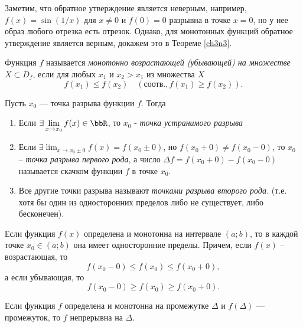 Заметим, что обратное утверждение является неверным, например, $f(x)= \sin(1/x)$ для $x\ne0$ и $f(0) = 0$ разрывна в точке $x = 0$, но у нее образ любого отрезка есть отрезок. Однако, для монотонных функций обратное утверждение является верным, докажем это в Теореме \ref{ch3n3}.
\begin{defn}
Функция $f$ называется \textit{монотонно возрастающей (убывающей) на множестве} $X \subset D_f$, если для любых $x_1$ и $x_2>x_1$ из множества $X$ 
$$
f(x_1)\le f(x_2) \quad (\text{соотв.}, f(x_1)\ge f(x_2)).
$$  
\end{defn}

\begin{defn}
Пусть $x_0$ --- точка разрыва функции $f$. Тогда 
\begin{enumerate}
\item

Если $\exists \lim_{x \to x_0}\limits f(x) \in \bbR$, то $x_0$ - \textit{точка устранимого разрыва}
\item
Если $\exists \lim_{x \to x_0\pm0}\limits f(x)=f(x_0\pm 0)$, но $f(x_0+0)\ne f(x_0-0)$, то $x_0$ -- \textit{точка разрыва первого рода}, а число $\Delta f=f(x_0+0)-f(x_0-0)$ называется скачком функции $f$ в точке $x_0$.
\item
Все другие точки разрыва называют \textit{точками разрыва второго рода.} (т.е. хотя бы один из односторонних пределов либо не существует, либо бесконечен).
\end{enumerate}
\end{defn}
\begin{thm} \label{ch3n1} 
Если функция $f(x)$ определена и монотонна на интервале $(a;b)$, то в каждой точке $x_0\in(a;b)$ она имеет односторонние пределы. Причем, если $f(x)$ -- возрастающая, то 
$$
f(x_0-0)\le f(x_0)\le f(x_0+0),
$$
а если убывающая, то
$$
f(x_0-0)\ge f(x_0)\ge f(x_0+0).
$$
\end{thm}
\begin{thm} \label{ch3n3} 
Если функция $f$ определена и монотонна на промежутке $\Delta$ и $f(\Delta)$ — промежуток, то $f$ непрерывна на $\Delta$.
\end{thm}
